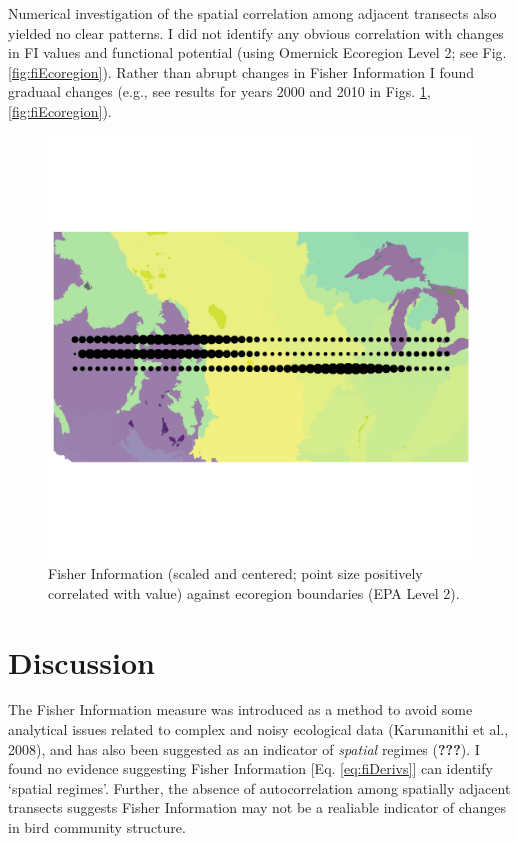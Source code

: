 \documentclass[12pt,twoside,openany]{reedthesis}
\begin{document}
Numerical investigation of the spatial correlation among adjacent
transects also yielded no clear patterns. I did not identify any obvious
correlation with changes in FI values and functional potential (using
Omernick Ecoregion Level 2; see Fig. \ref{fig:fiEcoregion}). Rather than
abrupt changes in Fisher Information I found graduaal changes (e.g., see
results for years 2000 and 2010 in Figs.
\ref{fig:fiEcoregion00},\ref{fig:fiEcoregion}).
\begin{figure}
\includegraphics[width=0.85\linewidth]{./chapterFiles/fisherSpatial/figures/figsCalledInDiss/scaledFiInterpolated_year2000_East-West} \caption{Fisher Information (scaled and centered; point size positively correlated with value) against ecoregion boundaries (EPA Level 2).}\label{fig:fiEcoregion00}
\end{figure}
\section{Discussion}\label{discussion-1}

The Fisher Information measure was introduced as a method to avoid some
analytical issues related to complex and noisy ecological data
(Karunanithi et al., 2008), and has also been suggested as an indicator
of \emph{spatial} regimes ({\textbf{???}}). I found no evidence
suggesting Fisher Information {[}Eq. \eqref{eq:fiDerivs}{]} can identify
`spatial regimes'. Further, the absence of autocorrelation among
spatially adjacent transects suggests Fisher Information may not be a
realiable indicator of changes in bird community structure.
\end{document}

